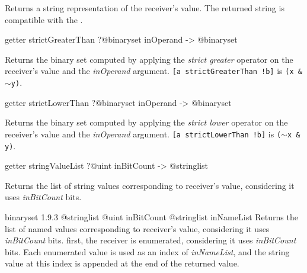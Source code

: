 Returns a string representation of the receiver's value. The returned string is compatible with the .








\begin{galgascode}
getter strictGreaterThan ?@binaryset inOperand -> @binaryset
\end{galgascode}

Returns the binary set computed by applying the \emph{strict greater} operator on the receiver's value and the \emph{inOperand} argument.
{\texttt{[a strictGreaterThan !b]} is \texttt{(x \& $\sim$y)}.}








\begin{galgascode}
getter strictLowerThan ?@binaryset inOperand -> @binaryset
\end{galgascode}

Returns the binary set computed by applying the \emph{strict lower} operator on the receiver's value and the \emph{inOperand} argument.
{\texttt{[a strictLowerThan !b]} is \texttt{($\sim$x \& y)}.}








\begin{galgascode}
getter stringValueList ?@uint inBitCount -> @stringlist
\end{galgascode}

Returns the list of string values corresponding to receiver's value, considering it uses \emph{inBitCount} bits.







{binaryset}
{1.9.3}
{@stringlist}
{@uint inBitCount}
{@stringlist inNameList}
{Returns the list of named values corresponding to receiver's value, considering it uses \emph{inBitCount} bits.}
{first, the receiver is enumerated, considering it uses \emph{inBitCount} bits. Each enumerated value is used as an index of \emph{inNameList}, and the string value at this index is appended at the end of the returned value.}







